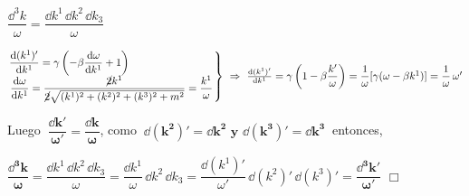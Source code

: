 $\dfrac{\dd^3 k}{\omega}= \dfrac{\dd k^1\, \dd k^2\, \dd k_3}{\omega}$


$ \left. \begin{matrix}
\displaystyle \dv{(k^1)'}{k^1}=\gamma \left(-\beta \dv{\omega}{k^1} + 1 \right)
\qquad \qquad \qquad \qquad   \\
\displaystyle \dv{\omega}{k^1}= \dfrac{\cancel{2}k^1}{\cancel{2} \sqrt{(k^1)^2+(k^2)^2+(k^3)^2+m^2}}=\dfrac{k^1}{\omega} 
\end{matrix} \right\} \ \Rightarrow \ \dv{(k^1)'}{k^1}=\gamma \left( 1-\beta \dfrac {k'}{\omega} \right) = \dfrac 1 \omega [\gamma (\omega - \beta k^1)] = \dfrac 1 \omega \, \omega' $

Luego $\ \displaystyle \boldsymbol{ \dfrac{\dd k'}{\omega'} = \dfrac{\dd k}{\omega}}$, como $\ \boldsymbol{ \dd (k^2)'=\dd k^2 \text{ y } \dd (k^3)'=\dd k^3}\ $ entonces,

$\boldsymbol{ \dfrac{\dd^3 k}{\omega}=} \dfrac{\dd k^1\, \dd k^2\, \dd k_3}{\omega} = \dfrac{\dd k^1}{\omega} \, \dd k^2\, \dd k_3 = \dfrac{\dd (k^1)'}{\omega'} \, \dd( k^2)' \, \dd (k^3)' = \boldsymbol{ \dfrac{\dd^3 k'}{\omega'}}$ \hspace{5cm} $\Box$






























\color{black}

